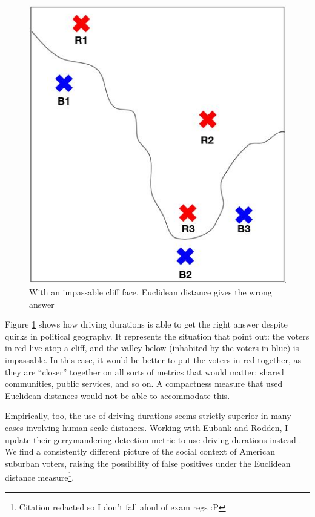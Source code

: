 \documentclass[]{article}
\begin{document}
\begin{figure}
\centering
\includegraphics{./img/hc_impassable.jpg}
\caption{With an impassable cliff face, Euclidean distance gives the
wrong answer \label{hc_impassible}}
\end{figure}

Figure \ref{hc_impassible} shows how driving durations is able to get
the right answer despite quirks in political geography. It represents
the situation that \cite{fh2011} point out: the voters in red live atop
a cliff, and the valley below (inhabited by the voters in blue) is
impassable. In this case, it would be better to put the voters in red
together, as they are ``closer'' together on all sorts of metrics that
would matter: shared communities, public services, and so on. A
compactness measure that used Euclidean distances would not be able to
accommodate this.

Empirically, too, the use of driving durations seems strictly superior
in many cases involving human-scale distances. Working with Eubank and
Rodden, I update their gerrymandering-detection metric to use driving
durations instead \citep{er2019}. We find a consistently different
picture of the social context of American suburban voters, raising the
possibility of false positives under the Euclidean distance
measure\footnote{Citation redacted so I don't fall afoul of exam regs :P}.
\end{document}
